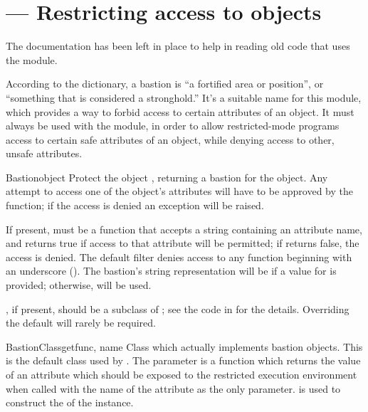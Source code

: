 \section{ ---
         Restricting access to objects}


\begin{notice}[warning]
  The documentation has been left in place to help in reading old code
  that uses the module.
\end{notice}


According to the dictionary, a bastion is ``a fortified area or
position'', or ``something that is considered a stronghold.''  It's a
suitable name for this module, which provides a way to forbid access
to certain attributes of an object.  It must always be used with the
 module, in order to allow restricted-mode programs
access to certain safe attributes of an object, while denying access
to other, unsafe attributes.


\begin{funcdesc}{Bastion}{object}
Protect the object , returning a bastion for the
object.  Any attempt to access one of the object's attributes will
have to be approved by the  function; if the access is
denied an  exception will be raised.

If present,  must be a function that accepts a string
containing an attribute name, and returns true if access to that
attribute will be permitted; if  returns false, the access
is denied.  The default filter denies access to any function beginning
with an underscore (\character{_}).  The bastion's string representation
will be  if a value for
 is provided; otherwise,  will be
used.

, if present, should be a subclass of ; 
see the code in  for the details.  Overriding the
default  will rarely be required.
\end{funcdesc}


\begin{classdesc}{BastionClass}{getfunc, name}
Class which actually implements bastion objects.  This is the default
class used by .  The  parameter is a
function which returns the value of an attribute which should be
exposed to the restricted execution environment when called with the
name of the attribute as the only parameter.   is used to
construct the  of the  instance.
\end{classdesc}
